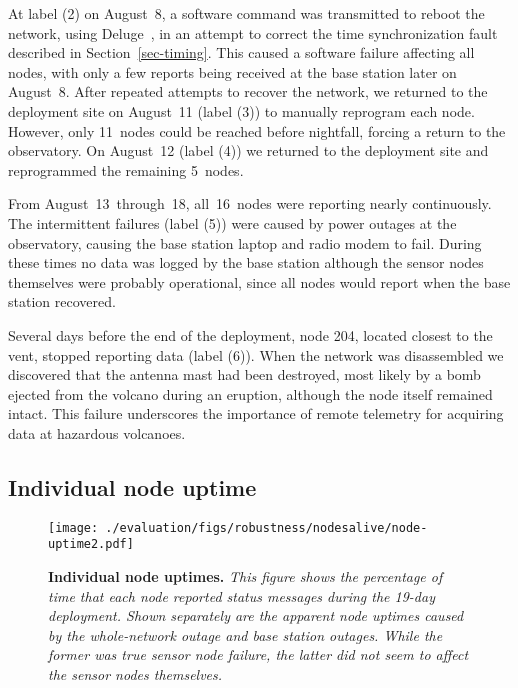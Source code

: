 At label (2) on August~8, a software command was transmitted to reboot the
network, using Deluge~\cite{deluge}, in an attempt to correct the
time synchronization fault described in Section~\ref{sec-timing}.
This caused a software failure affecting all nodes, 
with only a few reports being
received at the base station later on August~8. 
After repeated attempts to
recover the network, we returned to the deployment site on
August~11 (label (3)) to manually reprogram each node.  However, only
11~nodes could be reached before nightfall, forcing a return to the
observatory. On August~12 (label (4)) we returned to the
deployment site and reprogrammed the remaining 5~nodes. 

From August~13~through~18, all~16~nodes were reporting nearly continuously.
The intermittent failures (label (5)) were caused by power outages at the
observatory, causing the base station laptop and radio modem to fail. During
these times no data was logged by the base station although the sensor nodes
themselves were probably operational, since all nodes would report when the 
base station recovered.

Several days before the end of the deployment, node 204, located closest to
the vent, stopped reporting data (label (6)). When the network was
disassembled we discovered that the antenna mast had been destroyed, 
most likely by a bomb ejected from the volcano during an eruption, 
although the node itself remained intact. 
This failure underscores the importance of remote
telemetry for acquiring data at hazardous volcanoes.

\subsection{Individual node uptime}

\begin{figure}[t]
\begin{center}
\texttt{[image: ./evaluation/figs/robustness/nodesalive/node-uptime2.pdf]}
\end{center}
\caption{\small{\bf Individual node uptimes.}
{\em This figure shows the percentage of time that each node 
reported status messages during the 19-day deployment.
Shown separately are the apparent node uptimes caused by
the whole-network outage and 
base station outages. While the former was true
sensor node failure, the latter did not seem to affect the sensor 
nodes themselves.}}
\label{fig-nodeuptime}
\end{figure}

